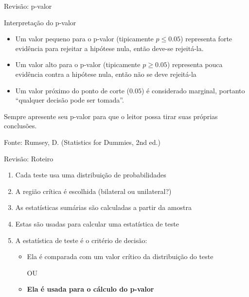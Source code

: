 \documentclass{beamer}
\begin{document}
\begin{frame}{\scriptsize Revisão: p-valor}
\begin{block}{Interpretação do p-valor}
  \begin{itemize}
    \footnotesize
  \item Um valor pequeno para o p-valor (tipicamente $p \le 0.05$)
    representa forte evidência para rejeitar a hipótese nula, então
    deve-se rejeitá-la.
    \medskip
  \item Um valor alto para o p-valor (tipicamente $p \ge 0.05$)
    representa pouca evidência contra a hipótese nula, então não se
    deve rejeitá-la
    \medskip
  \item Um valor próximo do ponto de corte ($0.05$) é considerado
    marginal, portanto ``qualquer decisão pode ser tomada''.
  \end{itemize}
  \begin{block}{}
    \small
    \begin{center}
      Sempre apresente seu p-valor para que o leitor possa tirar suas
      próprias conclusões.
    \end{center}
  \end{block}
\end{block}
\vfill
{\hfill \scriptsize Fonte: Rumsey, D. (Statistics for Dummies, 2nd ed.)}
\end{frame}

\begin{frame}{\scriptsize Revisão: Roteiro}
  \begin{enumerate}
    \footnotesize
  \item Cada teste usa uma distribuição de probabilidades
    \medskip
  \item A região crítica é escolhida (bilateral ou unilateral?)
    \medskip
  \item As estatísticas sumárias são calculadas a partir da amostra
    \medskip
  \item Estas são usadas para calcular uma estatística de teste
    \medskip
  \item A estatística de teste é o critério de decisão:
    \begin{itemize}
      \footnotesize
      \medskip
    \item Ela é comparada com um valor crítico da distribuição do teste
      \begin{center}
        OU
      \end{center}
    \item {\bf Ela é usada para o cálculo do p-valor}
    \end{itemize}
  \end{enumerate}
\end{frame}
\end{document}
